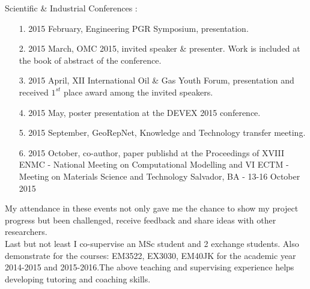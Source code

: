 \documentclass[12pt,a4paper,oneside]{report}%
\begin{document}
Scientific \& Industrial Conferences : 
\begin{enumerate}
\item[1.] 2015 February, Engineering PGR Symposium, presentation.
\item[2.] 2015 March, OMC 2015, invited speaker \& presenter. Work is included at the book of abstract of the conference.
\item[3.] 2015 April, XII International Oil \& Gas Youth Forum, presentation and received $1^{st}$ place award among the invited speakers.
\item[4.] 2015 May, poster presentation at the DEVEX 2015 conference. 
\item[5.] 2015 September, GeoRepNet, Knowledge and Technology transfer meeting. 
\item[6.] 2015 October, co-author, paper publishd at the Proceedings of XVIII ENMC - National Meeting on Computational Modelling and VI ECTM - Meeting on Materials Science and Technology Salvador, BA - 13-16 October 2015
\end{enumerate} 

\noindent My attendance in these events not only gave me the chance to show my project progress but been challenged, receive feedback and share ideas with other researchers.\\

Last but not least I co-supervise an MSc student and 2 exchange students. Also demonstrate for the courses: EM3522, EX3030, EM40JK for the academic year 2014-2015 and 2015-2016.The above teaching and supervising experience helps developing tutoring and coaching skills.\\

 



\nocite{Wendland1999901, Bhawanin2016, Servio2001127, Emera200852, Hill20136808, Gao199285, Haghighi200966, Wu19981634, Velaga201675, Lang2015130, Li201523, Farajnezhad2016181, Moortgat2016476, Zidane201564, Saad2016565, Kolev20151, Bastia, manninen1996mixture, hassanizadeh1980general, Amanda2015 }


\end{document}
